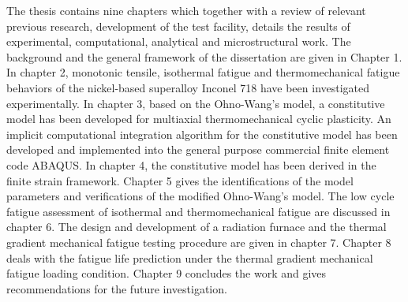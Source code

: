 The thesis contains nine chapters which together with a review of relevant previous research, development of the test facility, details the results of experimental, computational, analytical and microstructural work.
The background and the general framework of the dissertation are given in Chapter 1.
In chapter 2, monotonic tensile, isothermal fatigue and thermomechanical fatigue behaviors of the nickel-based superalloy Inconel 718 have been investigated experimentally.
In chapter 3, based on the Ohno-Wang's model, a constitutive model has been developed for multiaxial thermomechanical cyclic plasticity. An implicit computational integration algorithm for the constitutive model has been developed and implemented into the general purpose commercial finite element code ABAQUS.
In chapter 4, the constitutive model has been derived in the finite strain framework.
Chapter 5 gives the identifications of the model parameters and verifications of the modified Ohno-Wang's model.
The low cycle fatigue assessment of isothermal and thermomechanical fatigue are discussed in chapter 6.
The design and development of a radiation furnace and the thermal gradient mechanical fatigue testing procedure are given in chapter 7.
Chapter 8 deals with the fatigue life prediction under the thermal gradient mechanical fatigue loading condition.
Chapter 9 concludes the work and gives recommendations for the future investigation.




